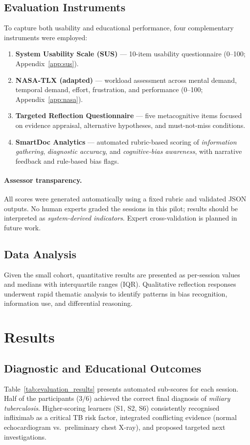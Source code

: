 \subsection{Evaluation Instruments}
To capture both usability and educational performance, four complementary instruments were
employed:
\begin{enumerate}
  \item \textbf{System Usability Scale (SUS)} — 10-item usability questionnaire
  (0–100; Appendix~\ref{app:sus}).
  \item \textbf{NASA-TLX (adapted)} — workload assessment across mental demand,
  temporal demand, effort, frustration, and performance (0–100; Appendix~\ref{app:nasa}).
  \item \textbf{Targeted Reflection Questionnaire} — five metacognitive items focused on
  evidence appraisal, alternative hypotheses, and must-not-miss conditions.
  \item \textbf{SmartDoc Analytics} — automated rubric-based scoring of
  \textit{information gathering}, \textit{diagnostic accuracy}, and
  \textit{cognitive-bias awareness}, with narrative feedback and rule-based bias flags.
\end{enumerate}

\paragraph{Assessor transparency.}
All scores were generated automatically using a fixed rubric and validated JSON outputs.
No human experts graded the sessions in this pilot; results should be interpreted
as \textit{system-derived indicators}. Expert cross-validation is planned in future work.

\subsection{Data Analysis}
Given the small cohort, quantitative results are presented as per-session values and
medians with interquartile ranges (IQR). Qualitative reflection responses underwent
rapid thematic analysis to identify patterns in bias recognition, information use, and
differential reasoning.

\section{Results}

\subsection{Diagnostic and Educational Outcomes}
Table~\ref{tab:evaluation_results} presents automated sub-scores for each session.
Half of the participants (\(3/6\)) achieved the correct final diagnosis of
\textit{miliary tuberculosis}. Higher-scoring learners (S1, S2, S6) consistently recognised
infliximab as a critical TB risk factor, integrated conflicting evidence
(normal echocardiogram vs.\ preliminary chest X-ray), and proposed targeted next
investigations.

